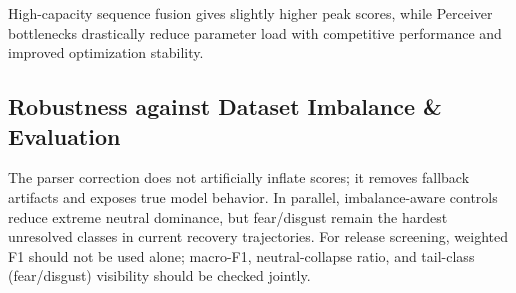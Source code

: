 \documentclass[11pt,a4paper,twocolumn]{article}
\begin{document}
High-capacity sequence fusion gives slightly higher peak scores, while Perceiver bottlenecks drastically reduce parameter load with competitive performance and improved optimization stability.

\subsection{Robustness against Dataset Imbalance \& Evaluation}
\begin{table}[htbp]
\centering
\small
{}
\caption{Robustness trajectory for imbalance handling and evaluation reliability. Parser correction removes fallback artifacts; imbalance controls reduce neutral collapse but minority-tail recovery remains open.}
\label{tab:robustness}
\end{table}

The parser correction does not artificially inflate scores; it removes fallback artifacts and exposes true model behavior. In parallel, imbalance-aware controls reduce extreme neutral dominance, but fear/disgust remain the hardest unresolved classes in current recovery trajectories.
For release screening, weighted F1 should not be used alone; macro-F1, neutral-collapse ratio, and tail-class (fear/disgust) visibility should be checked jointly.

\begin{table}[htbp]
\centering
\small
{}
\caption{Tail-risk audit snapshot from canonical recovery checkpoint (\texttt{outputs/recovery_R9b_kd_k4_fullDev/metrics_best.json}). Promotion gates pass on macro/minority/neutral controls, while fear and disgust remain unresolved.}
\label{tab:tail_risk_audit}
\end{table}
\end{document}
